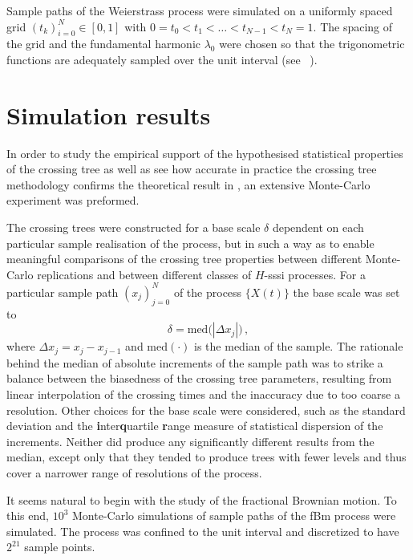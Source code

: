 Sample paths of the Weierstrass process were simulated on a uniformly spaced grid
$(t_k)_{i=0}^N\in [0,1]$ with $0 = t_0< t_1 < \ldots < t_{N-1} < t_N = 1$. The spacing
of the grid and the fundamental harmonic $\lambda_0$ were chosen so that the trigonometric
functions are adequately sampled over the unit interval (see ~\cite{decrouez2013estimation}).


\section{Simulation results} %
\label{sec:results}

In order to study the empirical support of the hypothesised statistical properties of
the crossing tree as well as see how accurate in practice the crossing tree methodology
confirms the theoretical result in \cite{ECP1673}, an extensive Monte-Carlo experiment
was preformed.

The crossing trees were constructed for a base scale $\delta$ dependent on each particular
sample realisation of the process, but in such a way as to enable meaningful comparisons
of the crossing tree properties between different Monte-Carlo replications and between
different classes of $H$-sssi processes. For a particular sample path $(x_j)_{j=0}^N$
of the process $\{X(t)\}$ the base scale was set to
\[ \delta = \text{med}\bigl( |\Delta x_j| \bigr) \,, \]
where $\Delta x_j = x_j - x_{j-1}$ and $\text{med}(\cdot)$ is the median of the
sample. The rationale behind the median of absolute increments of the sample path
was to strike a balance between the biasedness of the crossing tree parameters,
resulting from linear interpolation of the crossing times and the inaccuracy due to
too coarse a resolution. Other choices for the base scale were considered, such
as the standard deviation and the \textbf{i}nter\textbf{q}uartile \textbf{r}ange
measure of statistical dispersion of the increments. Neither did produce any significantly
different results from the median, except only that they tended to produce trees with
fewer levels and thus cover a narrower range of resolutions of the process.

It seems natural to begin with the study of the fractional Brownian motion. To this end,
$10^3$ Monte-Carlo simulations of sample paths of the fBm process were simulated. The
process was confined to the unit interval and discretized to have $2^{21}$ sample points.

